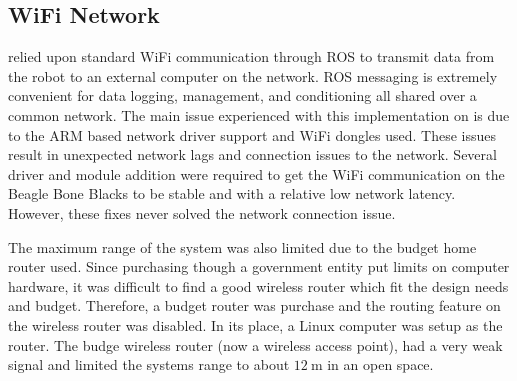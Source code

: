 \begin{appendices}
\subsection{WiFi Network}
\SB{} relied upon standard WiFi communication through ROS to transmit data from the robot to an external computer on the network.
ROS messaging is extremely convenient for data logging, management, and conditioning all shared over a common network.
The main issue experienced with this implementation on \SB{} is due to the ARM based network driver support and WiFi dongles used.
These issues result in unexpected network lags and connection issues to the network.
Several driver and module addition were required to get the WiFi communication on the Beagle Bone Blacks to be stable and with a relative low network latency.
However, these fixes never solved the network connection issue.

The maximum range of the system was also limited due to the budget home router used.
Since purchasing though a government entity put limits on computer hardware, it was difficult to find a good wireless router which fit the design needs and budget.
Therefore, a budget router was purchase and the routing feature on the wireless router was disabled.
In its place, a Linux computer was setup as the router.
The budge wireless router (now a wireless access point), had a very weak signal and limited the systems range to about \(\SI{12}{\meter}\) in an open space.


\end{appendices}
